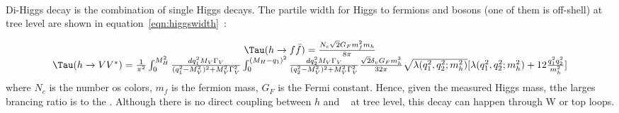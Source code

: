 \paragraph{}
Di-Higgs decay is the combination of single Higgs decays. The partile width for Higgs to fermions and bosons (one of them is off-shell) at tree level are shown in equation~\ref{eqn:higgswidth}~\cite{Djouadi}: 

\begin{equation}
\label{eqn:higgswidth}
\begin{array}{cc}
\Tau(h\to f\bar{f} ) = \frac{N_c \sqrt{2} G_{F} m_{f}^2 m_h}{8 \pi} \\
\Tau(h\to VV^{*} ) = \frac{1}{\pi^2} \int_{0}^{M_H^2} \frac{dq_1^2 M_V \Gamma_V}{(q_1^2-M_V^2)^2 + M_V^2\Gamma_V^2} \int_0^{(M_H - q_1)^2} \frac{dq_2^2 M_V \Gamma_V}{(q_2^2-M_V^2)^2 + M_V^2\Gamma_V^2} \frac{\sqrt{2} \delta_v G_{F} m_h^3}{32\pi} \sqrt{\lambda(q_1^2, q_2^2; m_h^2)} [\lambda(q_1^2, q_2^2; m_h^2) + 12\frac{q_1^2q_2^2}{m_h^2}]
\end{array}
\end{equation}
where $N_c$ is the number os colors, $m_f$ is the fermion mass, $G_{F}$ is the Fermi constant. Hence, given the measured Higgs mass, tthe larges brancing ratio is to the \bbbar. Although there is no direct coupling between $h$ and \gg~ at tree level, this decay can happen through W or top loops.

